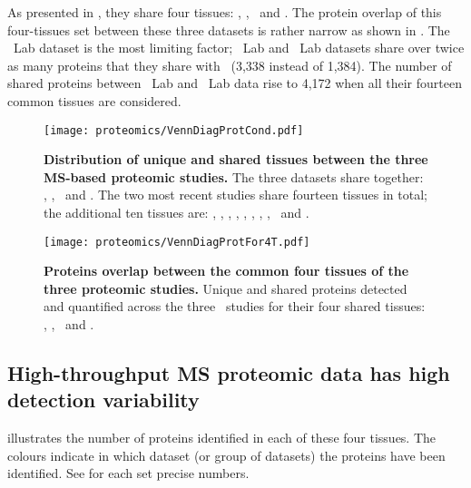 As presented in ,
they share four tissues: \heart, \lung, \ovary\ and \pancreas.
The protein overlap of this four-tissues set between these three datasets
is rather narrow as shown in .
The \cutler\ Lab dataset is the most limiting factor;
\pandey\ Lab and \kuster\ Lab datasets share over twice as many proteins
that they share with \cutler\ (3,338 instead of 1,384).
The number of shared proteins between \pandey\ Lab and \kuster\ Lab data rise to 4,172
when all their fourteen common tissues are considered.\mybr\

\begin{figure}[!htpb]
    \texttt{[image: proteomics/VennDiagProtCond.pdf]}\centering
    \vspace{-5mm}
    \caption[Distribution of unique shared tissues between
    the 3 MS-based proteomic studies]{\label{fig:VennDiagProt3}\textbf{Distribution
    of unique and shared tissues between the three MS-based proteomic studies.}
    The three datasets share together: \heart, \lung, \ovary\ and \pancreas.
    The two most recent studies share fourteen tissues in total;
    the additional ten tissues are: \adrenal, \hcolon, \gallbladder,
    \oesophagus, \kidney, \liver, \placenta, \prostate, \rectum\ and \testis.}
\end{figure}
\begin{figure}[!htpb]
    \texttt{[image: proteomics/VennDiagProtFor4T.pdf]}\centering
    \vspace{-5mm}
    \caption[Proteins overlap between the common tissues of
    the 3 proteomic studies]{\label{fig:VennProtComm}\textbf{Proteins
    overlap between the common four tissues of the three proteomic studies.}
    Unique and shared proteins detected and quantified
    across the three \ms\ studies for their four shared tissues:
    \heart, \lung, \ovary\ and \pancreas.}
\end{figure}
\clearpage
\subsection{High-throughput MS proteomic data has high detection variability}

illustrates the number of proteins identified in each of these four tissues.
The colours indicate in which dataset (or group of datasets)
the proteins have been identified.
See  for each set precise numbers.\mybr\

